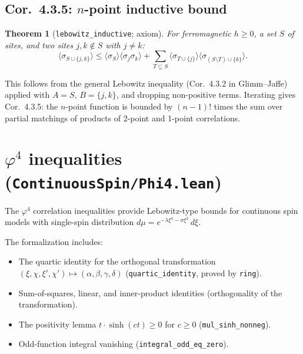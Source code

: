 \documentclass[a4paper,11pt]{article}
\newtheorem{theorem}{Theorem}
\begin{document}
\subsection[Cor.~4.3.5: n-point inductive bound]{Cor.~4.3.5: $n$-point inductive bound}

\begin{theorem}[\texttt{lebowitz\_inductive}; axiom]
For ferromagnetic $h \ge 0$, a set $S$ of sites, and two sites $j, k \notin S$
with $j \ne k$:
\[
  \langle\sigma_{S \cup \{j,k\}}\rangle \le
  \langle\sigma_S\rangle\langle\sigma_j\sigma_k\rangle
  + \sum_{T \subseteq S}
    \langle\sigma_{T \cup \{j\}}\rangle\langle\sigma_{(S\setminus T) \cup \{k\}}\rangle.
\]
\end{theorem}

This follows from the general Lebowitz inequality (Cor.~4.3.2 in
Glimm--Jaffe) applied with $A = S$, $B = \{j,k\}$, and dropping
non-positive terms.  Iterating gives Cor.~4.3.5: the $n$-point function
is bounded by $(n-1)!$ times the sum over partial matchings of products
of 2-point and 1-point correlations.

\section{\texorpdfstring{$\varphi^4$}{phi4} inequalities (\texttt{ContinuousSpin/Phi4.lean})}

The $\varphi^4$ correlation inequalities
\cite[{\S4.3, pp.~59--62}]{glimm-jaffe}
provide Lebowitz-type bounds for continuous spin models with
single-spin distribution $d\mu = e^{-\lambda\xi^4 - \sigma\xi^2}\,d\xi$.

The formalization includes:
\begin{itemize}
\item The quartic identity for the orthogonal transformation
  $(\xi,\chi,\xi',\chi') \mapsto (\alpha,\beta,\gamma,\delta)$
  (\texttt{quartic\_identity}, proved by \texttt{ring}).
\item Sum-of-squares, linear, and inner-product identities
  (orthogonality of the transformation).
\item The positivity lemma $t\cdot\sinh(ct) \ge 0$ for $c \ge 0$
  (\texttt{mul\_sinh\_nonneg}).
\item Odd-function integral vanishing (\texttt{integral\_odd\_eq\_zero}).
\end{itemize}
\end{document}
